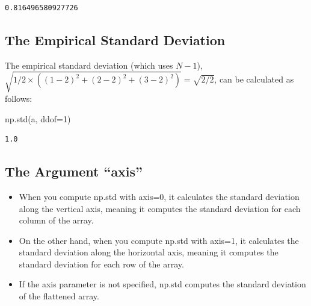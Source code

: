 \documentclass[
  letterpaper,
  DIV=11,
  numbers=noendperiod]{scrreprt}
\newenvironment{Shaded}{\begin{snugshade}}{\end{snugshade}}
\newcommand{\DecValTok}[1]{\textcolor[rgb]{0.68,0.00,0.00}{#1}}
\newcommand{\NormalTok}[1]{\textcolor[rgb]{0.00,0.23,0.31}{#1}}
\newcommand{\OperatorTok}[1]{\textcolor[rgb]{0.37,0.37,0.37}{#1}}
\providecommand{\tightlist}{%
  \setlength{\itemsep}{0pt}\setlength{\parskip}{0pt}}\usepackage{longtable,booktabs,array}
\begin{document}
\begin{verbatim}
0.816496580927726
\end{verbatim}

\hypertarget{the-empirical-standard-deviation}{%
\subsection{The Empirical Standard
Deviation}\label{the-empirical-standard-deviation}}

The empirical standard deviation (which uses \(N-1\)),
\(\sqrt{1/2 \times \left( (1-2)^2 + (2-2)^2 + (3-2)^2 \right)} = \sqrt{2/2}\),
can be calculated as follows:

\begin{Shaded}
\begin{Highlighting}[]
\NormalTok{np.std(a, ddof}\OperatorTok{=}\DecValTok{1}\NormalTok{)}
\end{Highlighting}
\end{Shaded}

\begin{verbatim}
1.0
\end{verbatim}

\hypertarget{the-argument-axis}{%
\subsection{The Argument ``axis''}\label{the-argument-axis}}

\begin{tcolorbox}[enhanced jigsaw, left=2mm, toprule=.15mm, colframe=quarto-callout-note-color-frame, leftrule=.75mm, title=\textcolor{quarto-callout-note-color}{\faInfo}\hspace{0.5em}{Axes along which the standard deviation is computed}, toptitle=1mm, opacitybacktitle=0.6, arc=.35mm, titlerule=0mm, opacityback=0, bottomtitle=1mm, coltitle=black, rightrule=.15mm, colback=white, colbacktitle=quarto-callout-note-color!10!white, breakable, bottomrule=.15mm]

\begin{itemize}
\tightlist
\item
  When you compute np.std with axis=0, it calculates the standard
  deviation along the vertical axis, meaning it computes the standard
  deviation for each column of the array.
\item
  On the other hand, when you compute np.std with axis=1, it calculates
  the standard deviation along the horizontal axis, meaning it computes
  the standard deviation for each row of the array.
\item
  If the axis parameter is not specified, np.std computes the standard
  deviation of the flattened array.
\end{itemize}

\end{tcolorbox}
\end{document}
